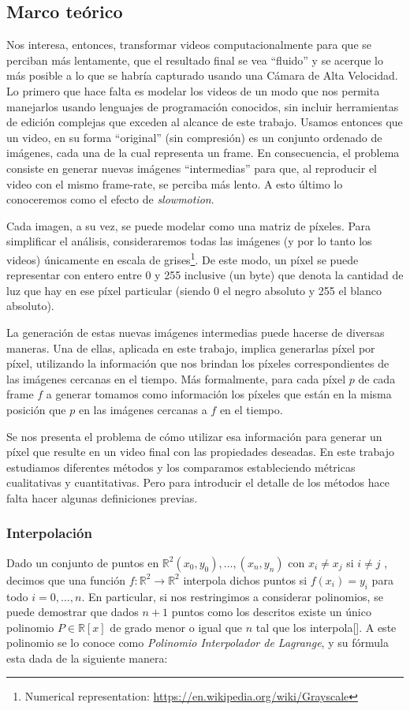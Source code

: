 \subsection{Marco teórico}
Nos interesa, entonces, transformar videos computacionalmente para que se perciban más lentamente, que el resultado final se vea ``fluido'' y se acerque lo más posible a lo que se habría capturado usando una Cámara de Alta Velocidad. Lo primero que hace falta es modelar los videos de un modo que nos permita manejarlos usando lenguajes de programación conocidos, sin incluir herramientas de edición complejas que exceden al alcance de este trabajo. Usamos entonces que un video, en su forma ``original'' (sin compresión) es un conjunto ordenado de imágenes, cada una de la cual representa un frame. En consecuencia, el problema consiste en generar nuevas imágenes ``intermedias'' para que, al reproducir el video con el mismo frame-rate, se perciba más lento. A esto \'ultimo lo conoceremos como el efecto de \emph{slowmotion}.

Cada imagen, a su vez, se puede modelar como una matriz de píxeles. Para simplificar el análisis, consideraremos todas las imágenes (y por lo tanto los videos) únicamente en escala de grises\footnote{Numerical representation: \url{https://en.wikipedia.org/wiki/Grayscale}}. De este modo, un píxel se puede representar con entero entre 0 y 255 inclusive (un byte) que denota la cantidad de luz que hay en ese píxel particular (siendo 0 el negro absoluto y 255 el blanco absoluto).

La generación de estas nuevas imágenes intermedias puede hacerse de diversas maneras. Una de ellas, aplicada en este trabajo, implica generarlas píxel por píxel, utilizando la información que nos brindan los píxeles correspondientes de las imágenes cercanas en el tiempo. Más formalmente, para cada píxel $p$ de cada frame $f$ a generar tomamos como información los píxeles que están en la misma posición que $p$ en las imágenes cercanas a $f$ en el tiempo.

Se nos presenta el problema de cómo utilizar esa información para generar un píxel que resulte en un video final con las propiedades deseadas. En este trabajo estudiamos diferentes métodos y los comparamos estableciendo métricas cualitativas y cuantitativas. Pero para introducir el detalle de los métodos hace falta hacer algunas definiciones previas.

\subsubsection{Interpolación}
Dado un conjunto de puntos en $\mathbb{R}^2 (x_0, y_0), \ldots, (x_n, y_n)$ con $x_i \neq x_j$ si $i \neq j$ , decimos que una función $f:\mathbb{R}^2 \rightarrow \mathbb{R}^2$ interpola dichos puntos si $f(x_i) = y_i$ para todo $i = 0, \ldots, n$. En particular, si nos restringimos a considerar polinomios, se puede demostrar que dados $n + 1$ puntos como los descritos existe un único polinomio $P \in \mathbb{R}[x]$ de grado menor o igual que $n$ tal que los interpola[\cite{wiki_lagrange_polynomial}]. A este polinomio se lo conoce como \emph{Polinomio Interpolador de Lagrange}, y su fórmula esta dada de la siguiente manera:

